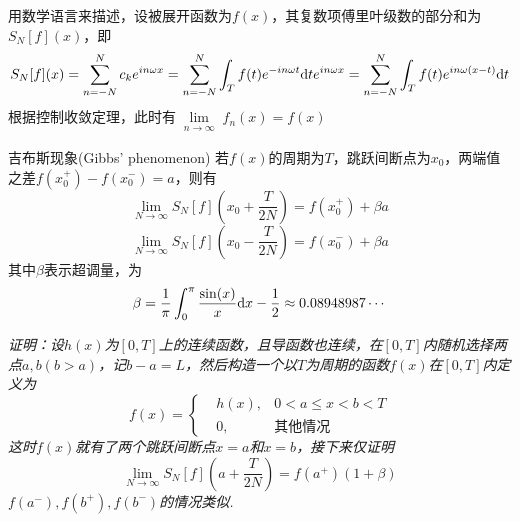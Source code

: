 \documentclass[main.tex]{subfiles}
\begin{document}
用数学语言来描述，设被展开函数为\(f(x)\)，其复数项傅里叶级数的部分和为\(S_N[f](x)\)，即
\[ S_N[f](x) = \sum_{n=-N}^{N} c_ke^{in\omega x} = \sum_{n=-N}^{N}\int_T f(t)e^{-in\omega t}{\rm d}t e^{in\omega x} = \sum_{n=-N}^{N}\int_Tf(t)e^{in\omega(x-t)}{\rm d}t \]
根据控制收敛定理，此时有\(\lim \limits_{\substack{n \to \infty}}f_n(x)=f(x)\)
\begin{theorem}{吉布斯现象(Gibbs' phenomenon)}
    若\(f(x)\)的周期为\(T\)，跳跃间断点为\(x_0\)，两端值之差\(f(x_0^+)-f(x_0^-)=a\)，则有
    \[\lim_{N \to \infty} S_N[f]\left(x_0+\frac{T}{2N}\right)=f(x_0^+)+\beta a\]
    \[\lim_{N \to \infty} S_N[f]\left(x_0-\frac{T}{2N}\right)=f(x_0^-)+\beta a\]
    其中\(\beta\)表示超调量，为
    \[\beta=\frac{1}{\pi}\int_{0}^{\pi}\frac{\sin(x)}{x}{\rm d}x-\frac{1}{2} \approx 0.08948987 \cdots\]
\end{theorem}
\textit{
    证明：设\(h(x)\)为\([0,T]\)上的连续函数，且导函数也连续，在\([0,T]\)内随机选择两点\(a,b(b>a)\)，记\(b-a=L\)，然后构造一个以\(T\)为周期的函数\(f(x)\)在\([0,T]\)内定义为
    \[f(x)=\left\{\begin{aligned} & h(x), & 0 < a \leq x < b < T \\ & 0, & \mbox{其他情况} \end{aligned}\right.\]
    这时\(f(x)\)就有了两个跳跃间断点\(x=a\)和\(x=b\)，接下来仅证明
    \[\lim_{N\to \infty} S_N[f](a+\frac{T}{2N})=f(a^+)(1+\beta)\]
    \(f(a^-),f(b^+),f(b^-)\)的情况类似.
}

\vspace{1cm}
\end{document}
